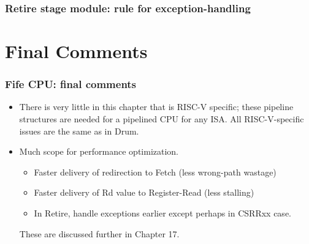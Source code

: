 
\begin{frame}[fragile]
\frametitle{Retire stage module: rule for exception-handling}

\footnotesize


\end{frame}


\section{Final Comments}

\begin{frame}[fragile]
\frametitle{Fife CPU: final comments}

\footnotesize

\begin{itemize}

 \item There is very little in this chapter that is RISC-V specific;
       these pipeline structures are needed for a pipelined CPU for
       any ISA. All RISC-V-specific issues are the same as in Drum.

 \PAUSE{\vspace{5ex}}

 \item Much scope for performance optimization. {\Eg}

    \begin{itemize}\footnotesize

      \item Faster delivery of redirection to Fetch (less wrong-path wastage)

      \item Faster delivery of Rd value to Register-Read (less stalling)

      \item In Retire, handle exceptions earlier except perhaps in CSRRxx case.
    \end{itemize}

    These are discussed further in Chapter 17.

\end{itemize}

\end{frame}






